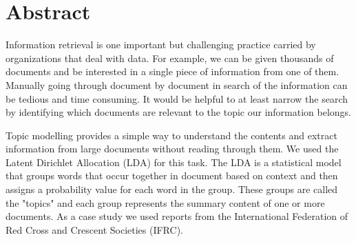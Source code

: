 
\chapter*{Abstract} 
Information retrieval is one  important but challenging practice carried by organizations that deal with data. For example, we can be given thousands of documents and be interested in a single piece of information from one of them. Manually going through document by document  in search of the information can be tedious and time consuming. It would be helpful to at least narrow the search by identifying which documents are relevant to the topic our information belongs.


Topic modelling  provides a simple way to understand the contents and extract information from  large documents without  reading through them. We used the Latent Dirichlet Allocation (LDA) for this task. The LDA  is a statistical model that groups words that occur together in document based on context and then assigns a probability value for each word in the group. These groups are called the "topics" and each group represents the summary content of one or more documents. 
As a case study we used reports from the International Federation of Red Cross and Crescent Societies (IFRC). 


%
%
%





